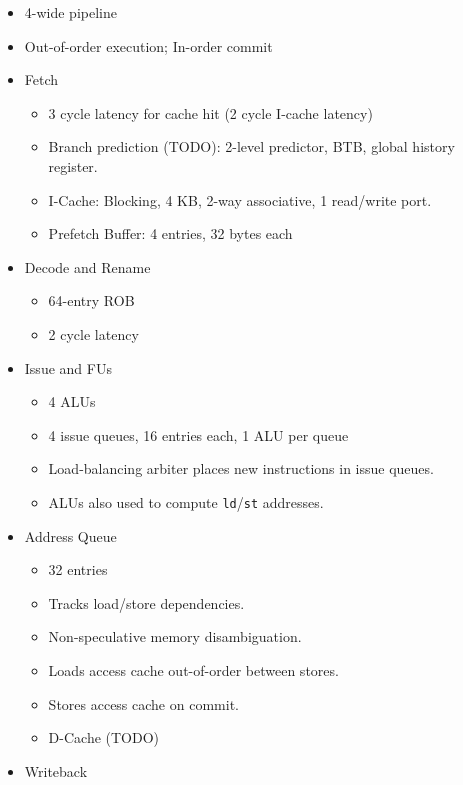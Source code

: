 \documentclass{article}
\begin{document}
\begin{itemize}
    \item 4-wide pipeline
    \item Out-of-order execution; In-order commit
    \item Fetch
        \begin{itemize}
            \item 3 cycle latency for cache hit (2 cycle I-cache latency)
            \item Branch prediction (TODO): 2-level predictor, BTB, global
                history register.
            \item I-Cache: Blocking, 4 KB, 2-way associative, 1 read/write port.
            \item Prefetch Buffer: 4 entries, 32 bytes each
        \end{itemize}
    \item Decode and Rename
        \begin{itemize}
            \item 64-entry ROB
            \item 2 cycle latency
        \end{itemize}
    \item Issue and FUs
        \begin{itemize}
            \item 4 ALUs
            \item 4 issue queues, 16 entries each, 1 ALU per queue
            \item Load-balancing arbiter places new instructions in issue
                queues.
            \item ALUs also used to compute \texttt{ld}/\texttt{st} addresses.
        \end{itemize}
    \item Address Queue
        \begin{itemize}
            \item 32 entries
            \item Tracks load/store dependencies.
            \item Non-speculative memory disambiguation.
            \item Loads access cache out-of-order between stores.
            \item Stores access cache on commit.
            \item D-Cache (TODO)
        \end{itemize}
    \item Writeback

\end{itemize}
\end{document}
